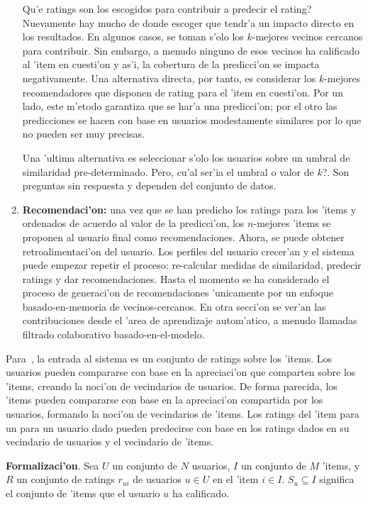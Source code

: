 \documentclass[11pt]{article}
\begin{document}
\begin{enumerate}
\smallskip
\textquestiondown Qu'e ratings son los escogidos para contribuir a predecir el rating? Nuevamente hay mucho de donde escoger que tendr'a un impacto directo en los resultados. En algunos casos, se toman s'olo los $k$-mejores vecinos cercanos para contribuir. Sin embargo, a menudo ninguno de esos vecinos ha calificado al 'item en cuesti'on y as'i, la cobertura de la predicci'on se impacta negativamente. Una alternativa directa, por tanto, es considerar los $k$-mejores recomendadores que disponen de rating para el 'item en cuesti'on. Por un lado, este m'etodo garantiza que se har'a una predicci'on; por el otro las predicciones se hacen con base en usuarios modestamente similares por lo que no pueden ser muy precisas.

\smallskip
Una 'ultima alternativa es seleccionar s'olo los usuarios sobre un umbral de similaridad pre-determinado. Pero, \textquestiondown cu'al ser'ia el umbral o valor de $k$?. Son preguntas sin respuesta y dependen del conjunto de datos.

\item \textbf{Recomendaci'on:} una vez que se han predicho los ratings para los 'items y ordenados de acuerdo al valor de la predicci'on, los $n$-mejores 'items se proponen al usuario final como recomendaciones. Ahora, se puede obtener retroalimentaci'on del usuario. Los perfiles del usuario crecer'an y el sistema puede empezar repetir el proceso: re-calcular medidas de similaridad, predecir ratings y dar recomendaciones. Hasta el momento se ha considerado el proceso de generaci'on de recomendaciones 'unicamente por un enfoque basado-en-memoria de vecinos-cercanos. En otra secci'on se ver'an las contribuciones desde el 'area de aprendizaje autom'atico, a menudo llamadas filtrado colaborativo basado-en-el-modelo.
\end{enumerate}

Para~\cite{start:candillier09}, la entrada al sistema es un conjunto de ratings sobre los 'items. Los usuarios pueden compararse con base en la apreciaci'on que comparten sobre los 'items, creando la noci'on de vecindarios de usuarios. De forma parecida, los 'items pueden compararse con base en la apreciaci'on compartida por los usuarios, formando la noci'on de vecindarios de 'items. Los ratings del 'item para un para un usuario dado  pueden predecirse con base en los ratings dados en su vecindario de usuarios y el vecindario de 'items.

\smallskip
\textbf{Formalizaci'on}. Sea $U$ un conjunto de $N$ usuarios, $I$ un conjunto de $M$ 'items, y $R$ un conjunto de ratings $r_{ui}$ de usuarios $u \in U$ en el 'item $i \in I$. $S_u \subseteq I$ significa el conjunto de 'items que el usuario $u$ ha calificado.
\end{document}
